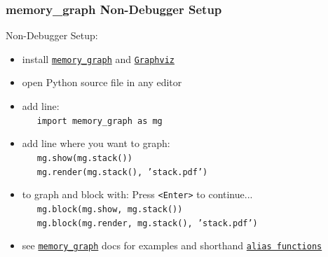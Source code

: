 \documentclass[10pt, colorlinks=true, urlcolor=blue]{beamer}
\begin{document}
\begin{frame}[fragile]\frametitle{memory\_graph Non-Debugger Setup}
  Non-Debugger Setup:
  \begin{itemize}
  \item install \href{https://pypi.org/project/memory-graph/}{\texttt{memory\_graph}} and \href{https://graphviz.org/download/}{\texttt{Graphviz}}
  \item open Python source file in any editor
  \item add line: \\ \ \ \ {\footnotesize \texttt{import memory_graph as mg}}
  \item add line where you want to graph: \\
    \ \ \ {\footnotesize \texttt{mg.show(mg.stack())}}\\
    \ \ \ {\footnotesize \texttt{mg.render(mg.stack(), 'stack.pdf')}}\\
  \item to graph and block with: Press \texttt{<Enter>} to continue...\\
    \ \ \ {\footnotesize \texttt{mg.block(mg.show, mg.stack())}}\\
    \ \ \ {\footnotesize \texttt{mg.block(mg.render, mg.stack(), 'stack.pdf')}}\\
  \item see \href{https://pypi.org/project/memory-graph/}{\texttt{memory\_graph}} docs for examples and shorthand \href{https://github.com/bterwijn/memory_graph?tab=readme-ov-file#debugging-without-debugger-tool}{\texttt{alias functions}}
  \end{itemize}
\end{frame}
\end{document}
